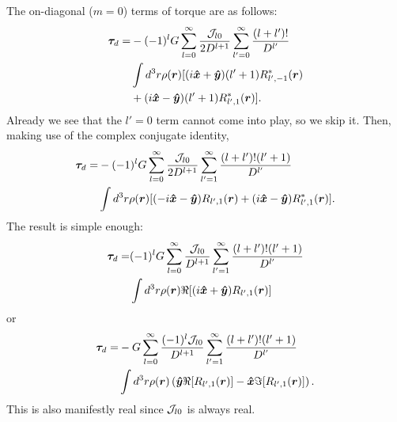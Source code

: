 \documentclass[aps,twocolumn,secnumarabic,balancelastpage,amsmath,amssymb,nofootinbib,floatfix]{revtex4-1}
\begin{document}
The on-diagonal ($m=0$) terms of torque are as follows:
\begin{equation*}
\begin{aligned}
\bm \tau_d = &-(-1)^l G\sum_{l=0}^\infty  \frac{\mathcal{J}_{l0}}{2D^{l+1}}\sum_{l'=0}^\infty \frac{(l+l')!}{D^{l'}}\\
& \int d^3 r\rho(\bm r)[(i\bm{\hat x} + \bm{\hat y})(l'+1)R^*_{l',-1}(\bm r)\\
&+(i\bm{\hat x}-\bm{\hat y})(l'+1)R^*_{l',1}(\bm r)].
\end{aligned}
\end{equation*}
Already we see that the $l'=0$ term cannot come into play, so we skip it. Then, making use of the complex conjugate identity,
\begin{equation*}
\begin{aligned}
\bm \tau_d = &-(-1)^l G\sum_{l=0}^\infty  \frac{\mathcal{J}_{l0}}{2D^{l+1}}\sum_{l'=1}^\infty \frac{(l+l')!(l'+1)}{D^{l'}}\\
& \int d^3 r\rho(\bm r)[(-i\bm{\hat x} - \bm{\hat y})R_{l',1}(\bm r)+(i\bm{\hat x}-\bm{\hat y})R^*_{l',1}(\bm r)].
\end{aligned}
\end{equation*}
The result is simple enough:
\begin{equation*}
\begin{aligned}
\bm \tau_d = &(-1)^l G\sum_{l=0}^\infty  \frac{\mathcal{J}_{l0}}{D^{l+1}}\sum_{l'=1}^\infty \frac{(l+l')!(l'+1)}{D^{l'}}\\
& \int d^3 r\rho(\bm r)\Re[(i\bm{\hat x} + \bm{\hat y})R_{l',1}(\bm r)]
\end{aligned}
\end{equation*}
or
\begin{equation*}
\begin{aligned}
\bm \tau_d = &-G\sum_{l=0}^\infty  \frac{(-1)^l \mathcal{J}_{l0}}{D^{l+1}}\sum_{l'=1}^\infty \frac{(l+l')!(l'+1)}{D^{l'}}\\
& \int d^3 r\rho(\bm r)\left( \bm{\hat y}\Re [R_{l',1}(\bm r)] - \bm{\hat x}\Im [R_{l',1}(\bm r)] \right).
\end{aligned}
\end{equation*}
This is also manifestly real since $\mathcal{J}_{l0}$ is always real.
\end{document}
